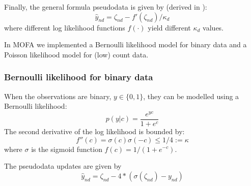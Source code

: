Finally, the general formula pseudodata is given by (derived in \cite{Seeger2012}):
\begin{equation*}
\hat{y}_{nd} = \zeta_{nd} - f'(\zeta_{nd})/\kappa_d
\end{equation*}
where different log likelihood functions $f(\cdot)$ yield different $\kappa_d$ values. 

In MOFA we implemented a Bernoulli likelihood model for binary data and a Poisson likelihood model for (low) count data.

\subsubsection*{Bernoulli likelihood for binary data}

When the observations are binary, $y \in \{0,1\}$, they can be modelled using a Bernoulli likelihood:
\begin{equation*}
	p(y|c) = \frac{e^{yc}}{1+e^c}
\end{equation*}
The second derivative of the log likelihood is bounded by:
\begin{equation*}
	f''(c) = \sigma(c)\sigma(-c) \leq 1/4 := \kappa
\end{equation*}
where $\sigma$ is the sigmoid function $f(c) = 1/(1+e^{-c})$. 

The pseudodata updates are given by
\begin{equation*}
	\hat{y}_{nd} = \zeta_{nd} - 4*(\sigma(\zeta_{nd}) - y_{nd})
\end{equation*}


